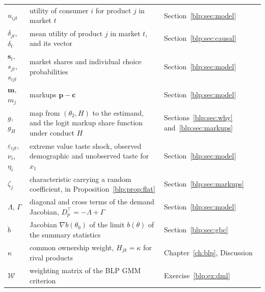 {\noindent\small\centering
\setlength{\tabcolsep}{4pt}\renewcommand{\arraystretch}{1.1}
\begin{tabular}{>{\raggedright\arraybackslash}p{1.0in}>{\raggedright\arraybackslash}p{2.15in}>{\raggedright\arraybackslash}p{0.95in}}
$u_{ijt}$ & utility of consumer $i$ for product $j$ in market $t$ & Section~\ref{blp:sec:model} \\
$\delta_{jt}$, $\delta_t$ & mean utility of product $j$ in market $t$, and its vector & Section~\ref{blp:sec:causal} \\
$\bm s_t$, $s_{jt}$, $s_{ijt}$ & market shares and individual choice probabilities & Section~\ref{blp:sec:model} \\
$\bm m$, $m_j$ & markups $\bm p - \bm c$ & Section~\ref{blp:sec:model} \\
$g$, $g_H$ & map from $(\theta_2, H)$ to the estimand, and the logit markup share function under conduct $H$ & Sections~\ref{blp:sec:why} and~\ref{blp:sec:markups} \\
$\varepsilon_{ijt}$, $\nu_i$, $\eta_i$ & extreme value taste shock, observed demographic and unobserved taste for $x_1$ & Section~\ref{blp:sec:model} \\
$\zeta_j$ & characteristic carrying a random coefficient, in Proposition~\ref{blp:prop:flat} & Section~\ref{blp:sec:markups} \\
$\Lambda$, $\Gamma$ & diagonal and cross terms of the demand Jacobian, $D_p^\top = -\Lambda + \Gamma$ & Section~\ref{blp:sec:model} \\
$\dot b$ & Jacobian $\nabla b(\theta_0)$ of the limit $b(\theta)$ of the summary statistics & Section~\ref{blp:sec:gbc} \\
$\kappa$ & common ownership weight, $H_{jk} = \kappa$ for rival products & Chapter~\ref{ch:blp}, Discussion \\
$\mathcal{W}$ & weighting matrix of the BLP GMM criterion & Exercise~\ref{blp:ex:dml} \\
\bottomrule
\end{tabular}\par}

\clearpage\flushbottom
